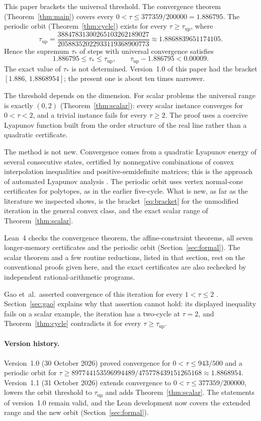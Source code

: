 \documentclass[11pt]{article}
\numberwithin{equation}{section}
\theoremstyle{definition}
\theoremstyle{remark}
\newcommand{\taulo}{943/500}
\newcommand{\taunew}{377359/200000}
\newcommand{\tauup}{\tau_{\mathrm{up}}}
\begin{document}
This paper brackets the universal threshold. The convergence theorem (Theorem~\ref{thm:main}) covers every $0<\tau\le\taunew=1.886795$. The periodic orbit (Theorem~\ref{thm:cycle}) exists for every $\tau\ge\tauup$, where
\[
\tauup=\frac{38847831300265103262189027}{20588352022933119368900773}\approx1.8868839651174105.
\]
Hence the supremum $\tau_*$ of steps with universal convergence satisfies
\begin{equation}\label{eq:bracket}
1.886795\le\tau_*\le\tauup,\qquad \tauup-1.886795<0.00009.
\end{equation}
The exact value of $\tau_*$ is not determined. Version~1.0 of this paper had the bracket $[1.886,\,1.8868954]$; the present one is about ten times narrower.

The threshold depends on the dimension. For scalar problems the universal range is exactly $(0,2)$ (Theorem~\ref{thm:scalar}): every scalar instance converges for $0<\tau<2$, and a trivial instance fails for every $\tau\ge2$. The proof uses a coercive Lyapunov function built from the order structure of the real line rather than a quadratic certificate.

The method is not new. Convergence comes from a quadratic Lyapunov energy of several consecutive states, certified by nonnegative combinations of convex interpolation inequalities and positive-semidefinite matrices; this is the approach of automated Lyapunov analysis \cite{UpadhyayaTight,AutoLyap}. The periodic orbit uses vertex normal-cone certificates for polytopes, as in the earlier five-cycle. What is new, as far as the literature we inspected shows, is the bracket~\eqref{eq:bracket} for the unmodified iteration in the general convex class, and the exact scalar range of Theorem~\ref{thm:scalar}.

Lean~4 checks the convergence theorem, the affine-constraint theorems, all seven longer-memory certificates and the periodic orbit (Section~\ref{sec:formal}). The scalar theorem and a few routine reductions, listed in that section, rest on the conventional proofs given here, and the exact certificates are also rechecked by independent rational-arithmetic programs.

Gao et~al.\ asserted convergence of this iteration for every $1<\tau\le2$ \cite{Gao2022}. Section~\ref{sec:gao} explains why that assertion cannot hold: its displayed inequality fails on a scalar example, the iteration has a two-cycle at $\tau=2$, and Theorem~\ref{thm:cycle} contradicts it for every $\tau\ge\tauup$.

\paragraph{Version history.} Version~1.0 (30 October 2026) proved convergence for $0<\tau\le\taulo$ and a periodic orbit for $\tau\ge897744153596994489/475778439151265168\approx1.8868954$. Version~1.1 (31 October 2026) extends convergence to $0<\tau\le\taunew$, lowers the orbit threshold to $\tauup$ and adds Theorem~\ref{thm:scalar}. The statements of version~1.0 remain valid, and the Lean development now covers the extended range and the new orbit (Section~\ref{sec:formal}).
\end{document}
